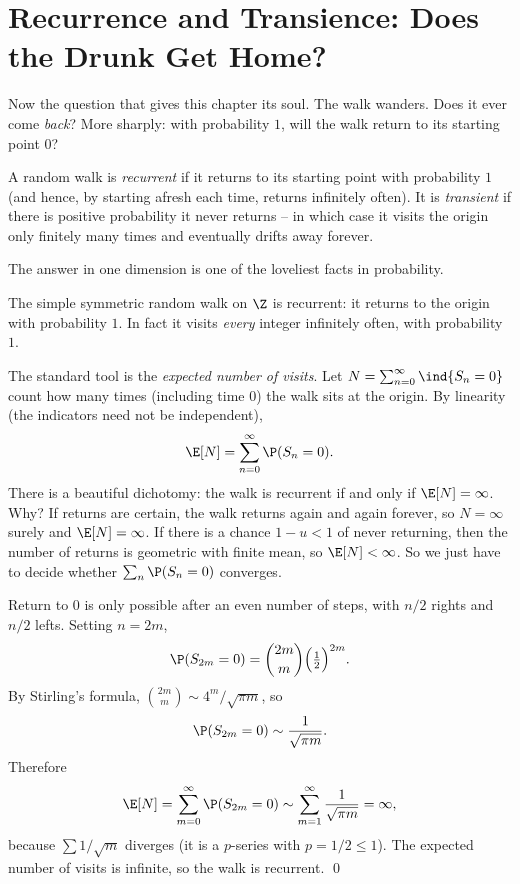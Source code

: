 \section{Recurrence and Transience: Does the Drunk Get Home?}
\label{ch26:recurrence}

Now the question that gives this chapter its soul. The walk wanders. Does it
ever come \emph{back}? More sharply: with probability $1$, will the walk return
to its starting point $0$?

\begin{definition}
\label{ch26:def-recurrence}
A random walk is \emph{recurrent} if it returns to its starting point with
probability $1$ (and hence, by starting afresh each time, returns infinitely
often). It is \emph{transient} if there is positive probability it never
returns -- in which case it visits the origin only finitely many times and
eventually drifts away forever.
\end{definition}

The answer in one dimension is one of the loveliest facts in probability.

\begin{theorem}
\label{ch26:thm-rec1d}
The simple symmetric random walk on $\Z$ is recurrent: it returns to the
origin with probability $1$. In fact it visits \emph{every} integer infinitely
often, with probability $1$.
\end{theorem}

\begin{whybox}
The standard tool is the \emph{expected number of visits}. Let
$N = \sum_{n=0}^\infty \ind\{S_n = 0\}$ count how many times (including time
$0$) the walk sits at the origin. By linearity (the indicators need not be
independent),
\[
  \E[N] = \sum_{n=0}^\infty \P(S_n = 0).
\]
There is a beautiful dichotomy: the walk is recurrent if and only if
$\E[N] = \infty$. Why? If returns are certain, the walk returns again and
again forever, so $N = \infty$ surely and $\E[N] = \infty$. If there is a
chance $1 - u < 1$ of never returning, then the number of returns is geometric
with finite mean, so $\E[N] < \infty$. So we just have to decide whether
$\sum_n \P(S_n = 0)$ converges.

Return to $0$ is only possible after an even number of steps, with $n/2$ rights
and $n/2$ lefts. Setting $n = 2m$,
\[
  \P(S_{2m} = 0) = \binom{2m}{m}\Big(\tfrac{1}{2}\Big)^{2m}.
\]
By Stirling's formula, $\binom{2m}{m} \sim 4^m/\sqrt{\pi m}$, so
\[
  \P(S_{2m} = 0) \sim \frac{1}{\sqrt{\pi m}}.
\]
Therefore
\[
  \E[N] = \sum_{m=0}^\infty \P(S_{2m}=0)
  \sim \sum_{m=1}^\infty \frac{1}{\sqrt{\pi m}} = \infty,
\]
because $\sum 1/\sqrt{m}$ diverges (it is a $p$-series with $p = 1/2 \le 1$).
The expected number of visits is infinite, so the walk is recurrent. \qed
\end{whybox}

